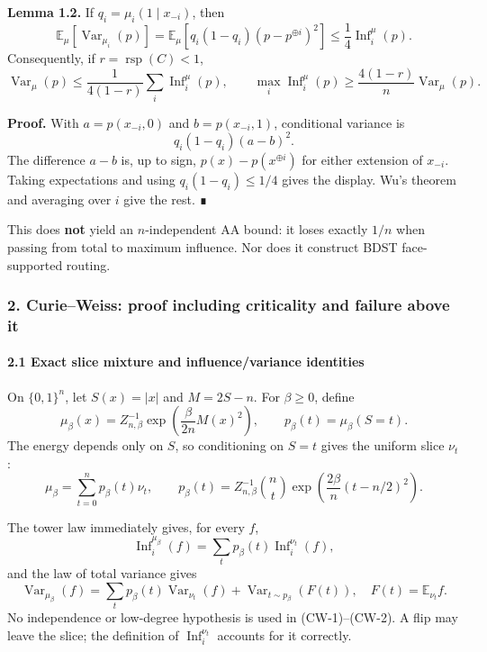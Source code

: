 \textbf{Lemma 1.2.} If \(q_i=\mu_i(1\mid x_{-i})\), then
\[\mathbb E_\mu[\operatorname{Var}_{\mu_i}(p)]
=\mathbb E_\mu[q_i(1-q_i)(p-p^{\oplus i})^2]
\le\frac14\operatorname{Inf}_i^\mu(p).\]
Consequently, if \(r=\operatorname{rsp}(C)<1\),
\[\operatorname{Var}_\mu(p)\le\frac{1}{4(1-r)}\sum_i\operatorname{Inf}_i^\mu(p),
\qquad
\max_i\operatorname{Inf}_i^\mu(p)\ge\frac{4(1-r)}n\operatorname{Var}_\mu(p).\]

\textbf{Proof.} With \(a=p(x_{-i},0)\) and \(b=p(x_{-i},1)\), conditional variance is
\[q_i(1-q_i)(a-b)^2.\]
The difference \(a-b\) is, up to sign, \(p(x)-p(x^{\oplus i})\) for either extension of \(x_{-i}\). Taking expectations and using \(q_i(1-q_i)\le1/4\) gives the display. Wu's theorem and averaging over \(i\) give the rest. ∎

This does \textbf{not} yield an \(n\)-independent AA bound: it loses exactly \(1/n\) when passing from total to maximum influence. Nor does it construct BDST face-supported routing.

\subsubsection{2. Curie--Weiss: proof including criticality and failure above it}\label{curieweiss-proof-including-criticality-and-failure-above-it}

\paragraph{2.1 Exact slice mixture and influence/variance identities}\label{exact-slice-mixture-and-influencevariance-identities}

On \(\{0,1\}^n\), let \(S(x)=|x|\) and \(M=2S-n\). For \(\beta\ge0\), define
\[
\mu_\beta(x)=Z_{n,\beta}^{-1}\exp\!\left(\frac{\beta}{2n}M(x)^2\right),\qquad
p_\beta(t)=\mu_\beta(S=t).
\]
The energy depends only on \(S\), so conditioning on \(S=t\) gives the uniform slice \(\nu_t\):
\[\mu_\beta=\sum_{t=0}^np_\beta(t)\nu_t,\qquad
p_\beta(t)=Z_{n,\beta}^{-1}\binom nt\exp\!\left(\frac{2\beta}{n}(t-n/2)^2\right).\]

The tower law immediately gives, for every \(f\),
\[
\operatorname{Inf}_i^{\mu_\beta}(f)=\sum_t p_\beta(t)\operatorname{Inf}_i^{\nu_t}(f), \tag{CW-1}
\]
and the law of total variance gives
\[
\operatorname{Var}_{\mu_\beta}(f)
=\sum_t p_\beta(t)\operatorname{Var}_{\nu_t}(f)
+\operatorname{Var}_{t\sim p_\beta}(F(t)),
\quad F(t)=\mathbb E_{\nu_t}f. \tag{CW-2}
\]
No independence or low-degree hypothesis is used in (CW-1)--(CW-2). A flip may leave the slice; the definition of \(\operatorname{Inf}_i^{\nu_t}\) accounts for it correctly.

